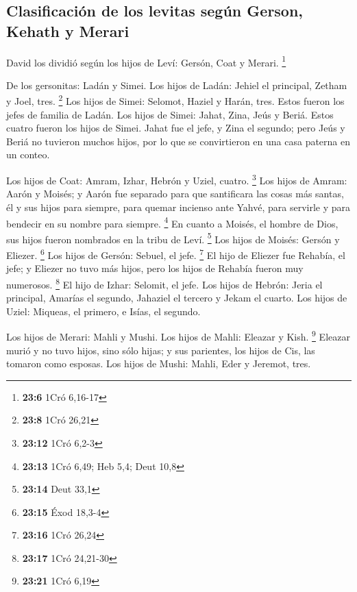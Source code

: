 \begin{paracol}{2}
\hypertarget{clasificaciuxf3n-de-los-levitas-seguxfan-gerson-kehath-y-merari}{%
\subsection{Clasificación de los levitas según Gerson, Kehath y
Merari}\label{clasificaciuxf3n-de-los-levitas-seguxfan-gerson-kehath-y-merari}}

 David los dividió según los hijos de Leví: Gersón, Coat y
Merari. \footnote{\textbf{23:6} 1Cró 6,16-17}

 De los gersonitas: Ladán y Simei.  Los
hijos de Ladán: Jehiel el principal, Zetham y Joel, tres. \footnote{\textbf{23:8}
  1Cró 26,21}  Los hijos de Simei: Selomot, Haziel y
Harán, tres. Estos fueron los jefes de familia de Ladán. 
Los hijos de Simei: Jahat, Zina, Jeús y Beriá. Estos cuatro fueron los
hijos de Simei.  Jahat fue el jefe, y Zina el segundo;
pero Jeús y Beriá no tuvieron muchos hijos, por lo que se convirtieron
en una casa paterna en un conteo.

 Los hijos de Coat: Amram, Izhar, Hebrón y Uziel, cuatro.
\footnote{\textbf{23:12} 1Cró 6,2-3}  Los hijos de Amram:
Aarón y Moisés; y Aarón fue separado para que santificara las cosas más
santas, él y sus hijos para siempre, para quemar incienso ante Yahvé,
para servirle y para bendecir en su nombre para siempre. \footnote{\textbf{23:13}
  1Cró 6,49; Heb 5,4; Deut 10,8}  En cuanto a Moisés, el
hombre de Dios, sus hijos fueron nombrados en la tribu de Leví.
\footnote{\textbf{23:14} Deut 33,1}  Los hijos de Moisés:
Gersón y Eliezer. \footnote{\textbf{23:15} Éxod 18,3-4} 
Los hijos de Gersón: Sebuel, el jefe. \footnote{\textbf{23:16} 1Cró
  26,24}  El hijo de Eliezer fue Rehabía, el jefe; y
Eliezer no tuvo más hijos, pero los hijos de Rehabía fueron muy
numerosos. \footnote{\textbf{23:17} 1Cró 24,21-30}  El
hijo de Izhar: Selomit, el jefe.  Los hijos de Hebrón:
Jeria el principal, Amarías el segundo, Jahaziel el tercero y Jekam el
cuarto.  Los hijos de Uziel: Miqueas, el primero, e
Isías, el segundo.

 Los hijos de Merari: Mahli y Mushi. Los hijos de Mahli:
Eleazar y Kish. \footnote{\textbf{23:21} 1Cró 6,19} 
Eleazar murió y no tuvo hijos, sino sólo hijas; y sus parientes, los
hijos de Cis, las tomaron como esposas.  Los hijos de
Mushi: Mahli, Eder y Jeremot, tres.


\end{paracol}
